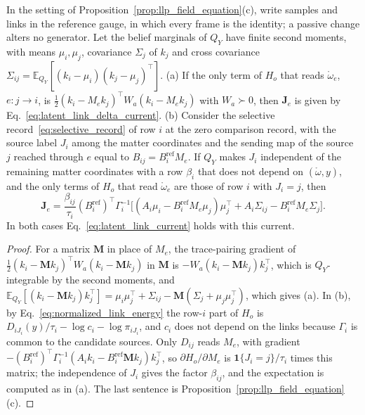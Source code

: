 \begin{corollary}\label{cor:llp_delta_rule}
In the setting of Proposition~\ref{prop:llp_field_equation}(c), write samples and links in the reference gauge, in which every frame is the identity; a passive change alters no generator. Let the belief marginals of $Q_Y$ have finite second moments, with means $\mu_i,\mu_j$, covariance $\Sigma_j$ of $k_j$ and cross covariance $\Sigma_{ij}=\mathbb E_{Q_Y}[(k_i-\mu_i)(k_j-\mu_j)^\top]$.
(a) If the only term of $H_o$ that reads $\mathring\omega_e$, $e:j\to i$, is $\frac12(k_i-M_ek_j)^\top W_a(k_i-M_ek_j)$ with $W_a\succ0$, then $\mathbf J_e$ is given by Eq.~\eqref{eq:latent_link_delta_current}.
(b) Consider the selective record~\eqref{eq:selective_record} of row $i$ at the zero comparison record, with the source label $J_i$ among the matter coordinates and the sending map of the source $j$ reached through $e$ equal to $B_{ij}=B_i^{\mathrm{ref}}M_e$. If $Q_Y$ makes $J_i$ independent of the remaining matter coordinates with a row $\beta_i$ that does not depend on $(\mathring\omega,y)$, and the only terms of $H_o$ that read $\mathring\omega_e$ are those of row $i$ with $J_i=j$, then
\begin{equation}
\mathbf J_e=\frac{\beta_{ij}}{\tau_i}(B_i^{\mathrm{ref}})^\top\Gamma_i^{-1}\bigl[(A_i\mu_i-B_i^{\mathrm{ref}}M_e\mu_j)\mu_j^\top+A_i\Sigma_{ij}-B_i^{\mathrm{ref}}M_e\Sigma_j\bigr].
\label{eq:llp_selective_current}
\end{equation}
In both cases Eq.~\eqref{eq:latent_link_current} holds with this current.
\end{corollary}

\begin{proof}
For a matrix $\mathbf M$ in place of $M_e$, the trace-pairing gradient of $\frac12(k_i-\mathbf Mk_j)^\top W_a(k_i-\mathbf Mk_j)$ in $\mathbf M$ is $-W_a(k_i-\mathbf Mk_j)k_j^\top$, which is $Q_Y$-integrable by the second moments, and $\mathbb E_{Q_Y}[(k_i-\mathbf Mk_j)k_j^\top]=\mu_i\mu_j^\top+\Sigma_{ij}-\mathbf M(\Sigma_j+\mu_j\mu_j^\top)$, which gives (a). In (b), by Eq.~\eqref{eq:normalized_link_energy} the row-$i$ part of $H_o$ is $D_{iJ_i}(y)/\tau_i-\log c_i-\log\pi_{iJ_i}$, and $c_i$ does not depend on the links because $\Gamma_i$ is common to the candidate sources. Only $D_{ij}$ reads $M_e$, with gradient $-(B_i^{\mathrm{ref}})^\top\Gamma_i^{-1}(A_ik_i-B_i^{\mathrm{ref}}\mathbf Mk_j)k_j^\top$, so $\partial H_o/\partial M_e$ is $\mathbf 1\{J_i=j\}/\tau_i$ times this matrix; the independence of $J_i$ gives the factor $\beta_{ij}$, and the expectation is computed as in (a). The last sentence is Proposition~\ref{prop:llp_field_equation}(c).
\end{proof}

